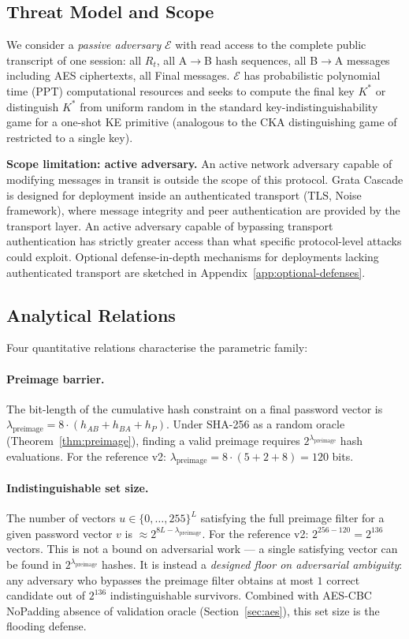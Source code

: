 \documentclass[11pt,a4paper]{article}
\begin{document}
\subsection{Threat Model and Scope}

We consider a \emph{passive adversary} $\mathcal{E}$ with read access to the complete public transcript of one session: all $R_t$, all A$\to$B hash sequences, all B$\to$A messages including AES ciphertexts, all Final messages. $\mathcal{E}$ has probabilistic polynomial time (PPT) computational resources and seeks to compute the final key $K^*$ or distinguish $K^*$ from uniform random in the standard key-indistinguishability game for a one-shot KE primitive (analogous to the CKA distinguishing game of~\cite{ACD19} restricted to a single key).

\textbf{Scope limitation: active adversary.} An active network adversary capable of modifying messages in transit is outside the scope of this protocol. Grata Cascade is designed for deployment inside an authenticated transport (TLS, Noise framework), where message integrity and peer authentication are provided by the transport layer. An active adversary capable of bypassing transport authentication has strictly greater access than what specific protocol-level attacks could exploit. Optional defense-in-depth mechanisms for deployments lacking authenticated transport are sketched in Appendix~\ref{app:optional-defenses}.

\subsection{Analytical Relations}

Four quantitative relations characterise the parametric family:

\paragraph{Preimage barrier.} The bit-length of the cumulative hash constraint on a final password vector is $\lambda_{\text{preimage}} = 8 \cdot (h_{AB} + h_{BA} + h_P)$. Under SHA-256 as a random oracle (Theorem~\ref{thm:preimage}), finding a valid preimage requires $2^{\lambda_{\text{preimage}}}$ hash evaluations. For the reference v2: $\lambda_{\text{preimage}} = 8 \cdot (5 + 2 + 8) = 120$ bits.

\paragraph{Indistinguishable set size.} The number of vectors $u \in \{0,\ldots,255\}^L$ satisfying the full preimage filter for a given password vector $v$ is $\approx 2^{8L - \lambda_{\text{preimage}}}$. For the reference v2: $2^{256 - 120} = 2^{136}$ vectors. This is not a bound on adversarial work --- a single satisfying vector can be found in $2^{\lambda_{\text{preimage}}}$ hashes. It is instead a \emph{designed floor on adversarial ambiguity}: any adversary who bypasses the preimage filter obtains at most $1$ correct candidate out of $2^{136}$ indistinguishable survivors. Combined with AES-CBC NoPadding absence of validation oracle (Section~\ref{sec:aes}), this set size is the flooding defense.
\end{document}
